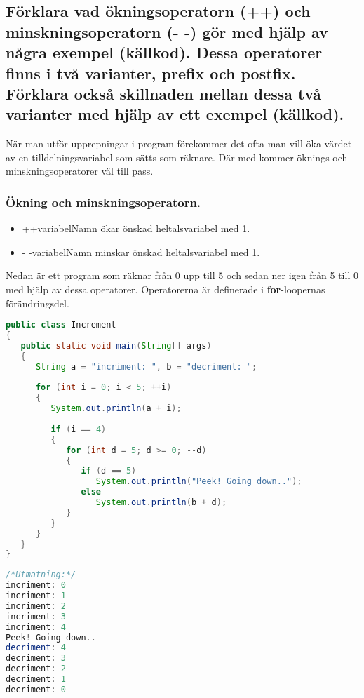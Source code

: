 \documentclass[../main.tex]{subfiles}
\begin{document}
\subsection{Förklara vad ökningsoperatorn (++) och minskningsoperatorn (- -) gör med hjälp av några exempel (källkod).
Dessa operatorer finns i två varianter, prefix och postfix.
Förklara också skillnaden mellan dessa två varianter med hjälp av ett exempel (källkod).}

När man utför upprepningar i program förekommer det ofta man vill öka värdet av en tilldelningsvariabel som sätts som räknare. Där med kommer öknings och minskningsoperatorer väl till pass.

\subsubsection{Ökning och minskningsoperatorn.}
\begin{itemize}
    \item ++variabelNamn ökar önskad heltalsvariabel med 1.
    \item - -variabelNamn minskar önskad heltalsvariabel med 1.
\end{itemize}
Nedan är ett program som räknar från 0 upp till 5 och sedan ner igen från 5 till 0 med hjälp av dessa operatorer.
Operatorerna är definerade i \textbf{for}-loopernas förändringsdel.
\begin{lstlisting}[language=java]
public class Increment
{
   public static void main(String[] args)
   {
      String a = "incriment: ", b = "decriment: ";
      
      for (int i = 0; i < 5; ++i)
      {
         System.out.println(a + i);
         
         if (i == 4)
         {
            for (int d = 5; d >= 0; --d)
            {
               if (d == 5)
                  System.out.println("Peek! Going down..");
               else
                  System.out.println(b + d);
            }
         }
      }
   }
}
\end{lstlisting}

\newpage

\begin{lstlisting}[language=java]
/*Utmatning:*/
incriment: 0
incriment: 1
incriment: 2
incriment: 3
incriment: 4
Peek! Going down..
decriment: 4
decriment: 3
decriment: 2
decriment: 1
decriment: 0
\end{lstlisting}
\end{document}
